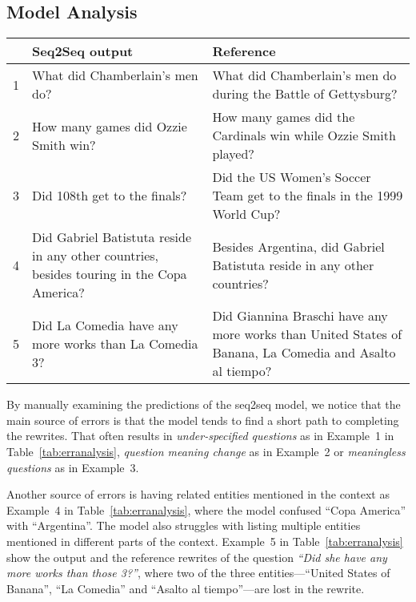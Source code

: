 \subsection{Model Analysis}
\label{sec:models}
\begin{table*}
\centering
\begin{tabular}{lp{6cm}p{8.5cm}}
	  \toprule
	 & \textbf{Seq2Seq output } & \textbf{Reference}\\
  \hline
1 & What did Chamberlain's men do? & What did Chamberlain's men do during the Battle of Gettysburg? \\
  2 & How many games did Ozzie Smith win? & How many games did the Cardinals win while Ozzie Smith played? \\
  3 & Did 108th get to the finals? & Did the US Women's Soccer Team get to the finals in the 1999 World Cup? \\
  4 & Did Gabriel Batistuta reside in any other countries, besides touring in the Copa America? & Besides Argentina, did Gabriel Batistuta reside in any other countries? \\
5 & Did La Comedia have any more works than La Comedia 3? & Did Giannina Braschi have any more works than United States of Banana, La Comedia and Asalto al tiempo? \\
\bottomrule
\end{tabular}
\caption{Example erroneous rewrites generated by the Seq2Seq models
and their corresponding reference rewrites. The dominant
source of error is the model tendency to produce
short rewrites (Examples 1--3). Related entities (Copa America and Argentina in Example 4) distract the model. The model
struggles with listing multiple entities mentioned in different
parts of the context (Example 5).
}
  \label{tab:erranalysis}
\end{table*}


By manually examining the predictions of the seq2seq model, we notice that the main source of errors is that the model tends to find a short path to completing the rewrites. That often results in \textit{under-specified questions} as in Example~1 in Table~\ref{tab:erranalysis}, \textit{question meaning change} as in Example~2 or \textit{meaningless questions} as in Example~3.

Another source of errors is having related entities mentioned in the context as 
Example~4 in Table~\ref{tab:erranalysis}, where the model confused ``Copa America''
with ``Argentina''. The model also struggles with listing multiple entities mentioned in different parts of the context. Example~5 in Table~\ref{tab:erranalysis}
show the output and the reference rewrites of the question \textit{``Did she have any more works than those 3?''}, where two of the three
	entities---``United States of Banana'', ``La Comedia'' and ``Asalto al tiempo''---are lost in the rewrite.  





